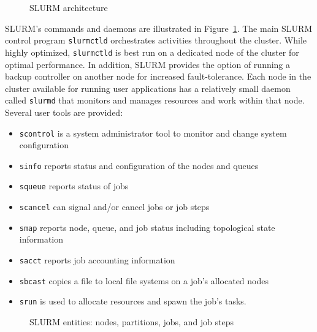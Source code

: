 \documentclass[10pt,onecolumn,times]{../common/llncs}
\begin{document}
{\begin{figure}[tb]
\centerline{}
\caption{\small SLURM architecture}
\label{arch}
\end{figure}


SLURM's commands and daemons are illustrated in Figure~\ref{arch}.
The main SLURM control program {\tt slurmctld} orchestrates
activities throughout the cluster. While highly optimized, 
{\tt slurmctld} is best run on a dedicated node of the cluster for optimal performance. 
In addition, SLURM provides the option of running  a backup controller 
on another node for increased fault-tolerance.
Each node in the cluster available for running user applications 
has a relatively small daemon called {\tt slurmd} that monitors
and manages resources and work within that node. 
Several user tools are provided:

\begin{itemize}
\item {\tt scontrol} is a system administrator tool to monitor and change
system configuration

\item {\tt sinfo} reports status and configuration of the nodes and queues

\item {\tt squeue} reports status of jobs

\item {\tt scancel} can signal and/or cancel jobs or job steps

\item {\tt smap} reports node, queue, and job status including 
topological state information

\item {\tt sacct} reports job accounting information

\item {\tt sbcast} copies a file to local file systems on a job's allocated nodes

\item {\tt srun} is used to allocate resources and spawn the job's tasks.
\end{itemize}

\begin{figure}[tcb]
\centerline{}
\caption{\small SLURM entities: nodes, partitions, jobs, and job steps}
\label{entities}
\end{figure}

}
\end{document}
